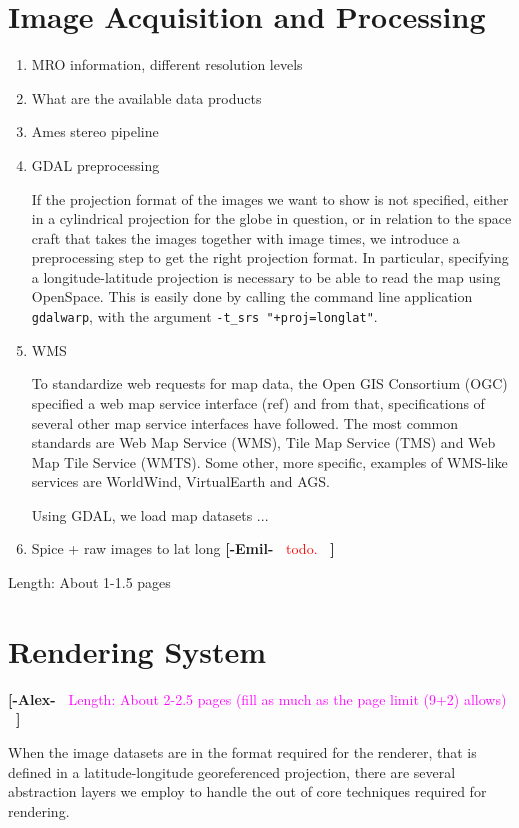 \documentclass[journal]{vgtc}                %
\newcommand{\emilcomment}[1]{\textbf{[-Emil-~}
    \textcolor{red}{#1}
    \textbf{~]}}
\newcommand{\alexcomment}[1]{\textbf{[-Alex-~}
    \textcolor{magenta}{#1}
    \textbf{~]}}
\begin{document}
\section{Image Acquisition and Processing} \label{sec:imageacquisitionprocessing}
\begin{enumerate}
  \item MRO information, different resolution levels
  \item What are the available data products
  \item Ames stereo pipeline
  \item GDAL preprocessing


If the projection format of the images we want to show is not specified, either in a cylindrical projection for the globe in question, or in relation to the space craft that takes the images together with image times, we introduce a preprocessing step to get the right projection format.
In particular, specifying a longitude-latitude projection is necessary to be able to read the map using OpenSpace.
This is easily done by calling the command line application \texttt{gdalwarp}, with the argument \texttt{-t\_srs "+proj=longlat"}.

\item WMS

To standardize web requests for map data, the Open GIS Consortium (OGC) specified a web map service interface (ref) and from that, specifications of several other map service interfaces have followed.
The most common standards are Web Map Service (WMS), Tile Map Service (TMS) and Web Map Tile Service (WMTS). Some other, more specific, examples of WMS-like services are WorldWind, VirtualEarth and AGS.

Using GDAL, we load map datasets ...
  
  \item Spice + raw images to lat long \emilcomment{todo.}
\end{enumerate}
Length: About 1-1.5 pages

\section{Rendering System} \label{sec:renderingsystem}

\alexcomment{Length: About 2-2.5 pages (fill as much as the page limit (9+2) allows)}


When the image datasets are in the format required for the renderer, that is defined in a latitude-longitude georeferenced projection, there are several abstraction layers we employ to handle the out of core techniques required for rendering.
\end{document}
